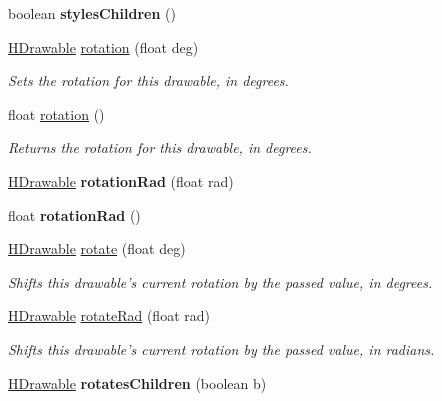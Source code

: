\begin{DoxyCompactItemize}
\item 
\hypertarget{classhype_1_1core_1_1drawable_1_1_h_drawable_af6f37964d79fcad3c3f2d011e8f44f9d}{boolean {\bfseries styles\-Children} ()}\label{classhype_1_1core_1_1drawable_1_1_h_drawable_af6f37964d79fcad3c3f2d011e8f44f9d}

\item 
\hyperlink{classhype_1_1core_1_1drawable_1_1_h_drawable}{H\-Drawable} \hyperlink{classhype_1_1core_1_1drawable_1_1_h_drawable_a87f1d8b6e7108e5229b6b9cb5eaf45a5}{rotation} (float deg)
\begin{DoxyCompactList}\small\item\em Sets the rotation for this drawable, in degrees. \end{DoxyCompactList}\item 
float \hyperlink{classhype_1_1core_1_1drawable_1_1_h_drawable_a9cfc2146ce028c14a1063ff77d88fb6e}{rotation} ()
\begin{DoxyCompactList}\small\item\em Returns the rotation for this drawable, in degrees. \end{DoxyCompactList}\item 
\hypertarget{classhype_1_1core_1_1drawable_1_1_h_drawable_a2a52c76cb32def1904a540e0bc25cf69}{\hyperlink{classhype_1_1core_1_1drawable_1_1_h_drawable}{H\-Drawable} {\bfseries rotation\-Rad} (float rad)}\label{classhype_1_1core_1_1drawable_1_1_h_drawable_a2a52c76cb32def1904a540e0bc25cf69}

\item 
\hypertarget{classhype_1_1core_1_1drawable_1_1_h_drawable_a3950c94397be45408d68ab1c2017d062}{float {\bfseries rotation\-Rad} ()}\label{classhype_1_1core_1_1drawable_1_1_h_drawable_a3950c94397be45408d68ab1c2017d062}

\item 
\hyperlink{classhype_1_1core_1_1drawable_1_1_h_drawable}{H\-Drawable} \hyperlink{classhype_1_1core_1_1drawable_1_1_h_drawable_a70b50dc6d7d6f41db1581658cb01c0e1}{rotate} (float deg)
\begin{DoxyCompactList}\small\item\em Shifts this drawable's current rotation by the passed value, in degrees. \end{DoxyCompactList}\item 
\hyperlink{classhype_1_1core_1_1drawable_1_1_h_drawable}{H\-Drawable} \hyperlink{classhype_1_1core_1_1drawable_1_1_h_drawable_aea2c7f8c537f94274afe8219a8dd79bf}{rotate\-Rad} (float rad)
\begin{DoxyCompactList}\small\item\em Shifts this drawable's current rotation by the passed value, in radians. \end{DoxyCompactList}\item 
\hypertarget{classhype_1_1core_1_1drawable_1_1_h_drawable_a502ebf38c8de342a7fc3fbf59ad75d55}{\hyperlink{classhype_1_1core_1_1drawable_1_1_h_drawable}{H\-Drawable} {\bfseries rotates\-Children} (boolean b)}\label{classhype_1_1core_1_1drawable_1_1_h_drawable_a502ebf38c8de342a7fc3fbf59ad75d55}


\end{DoxyCompactItemize}
